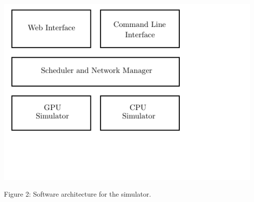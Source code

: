 \documentclass[11pt]{article}
\begin{document}
\begin{multicols}{2}
\begin{Figure}
\hspace{0.1in}
\includegraphics{diagrams/architecture.pdf}

\vspace{-0.5in}

{Figure 2: Software architecture for the simulator.}
\end{Figure}




\end{multicols}
\end{document}
